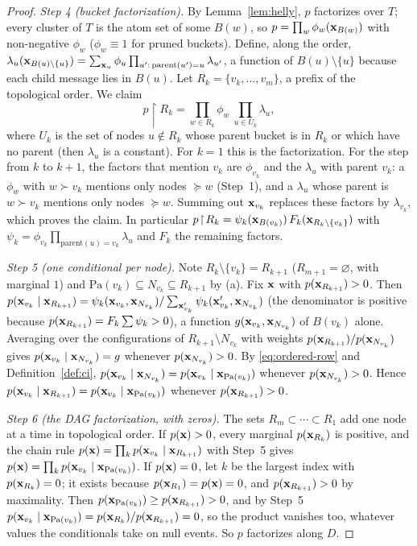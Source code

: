 \documentclass{article} %
\newcommand{\restr}{\!\restriction\!}
\providecommand{\Pa}{\mathrm{Pa}}
\begin{document}
\begin{proof}
\emph{Step 4 (bucket factorization).} By Lemma~\ref{lem:helly}, $p$ factorizes
over $T$; every cluster of $T$ is the atom set of some $B(w)$, so
$p=\prod_{w}\phi_w(\mathbf{x}_{B(w)})$ with non-negative $\phi_w$ ($\phi_w\equiv1$ for pruned
buckets). Define, along the order,
$\lambda_u(\mathbf{x}_{B(u)\setminus\{u\}})=\sum_{\mathbf{x}_u}\phi_u\prod_{u':\,\mathrm{parent}(u')=u}\lambda_{u'}$,
a function of $B(u)\setminus\{u\}$ because each child message lies in $B(u)$.
Let $R_k=\{v_k,\dots,v_m\}$, a prefix of the topological order. We claim
\[
  p\restr R_k=\prod_{w\in R_k}\phi_w\ \prod_{u\in U_k}\lambda_u ,
\]
where $U_k$ is the set of nodes $u\notin R_k$ whose parent bucket is in $R_k$ or
which have no parent (then $\lambda_u$ is a constant). For $k=1$ this is the
factorization. For the step from $k$ to $k+1$, the factors that mention $v_k$
are $\phi_{v_k}$ and the $\lambda_u$ with parent $v_k$: a $\phi_w$ with
$w\succ v_k$ mentions only nodes $\succeq w$ (Step~1), and a $\lambda_u$ whose
parent is $w\succ v_k$ mentions only nodes $\succeq w$. Summing out $\mathbf{x}_{v_k}$
replaces these factors by $\lambda_{v_k}$, which proves the claim.
In particular $p\restr R_k=\psi_k(\bx_{B(v_k)})\,F_k(\bx_{R_k\setminus\{v_k\}})$ with
$\psi_k=\phi_{v_k}\prod_{\mathrm{parent}(u)=v_k}\lambda_u$ and $F_k$ the remaining
factors.

\emph{Step 5 (one conditional per node).} Note $R_k\setminus\{v_k\}=R_{k+1}$
($R_{m+1}=\varnothing$, with marginal $1$) and $\Pa(v_k)\subseteq N_{v_k}\subseteq
R_{k+1}$ by (a). Fix $\mathbf{x}$ with $p(\mathbf{x}_{R_{k+1}})>0$. Then
$p(\mathbf{x}_{v_k}\mid\mathbf{x}_{R_{k+1}})=\psi_k(\mathbf{x}_{v_k},\mathbf{x}_{N_{v_k}})/\sum_{\mathbf{x}'_{v_k}}\psi_k(\mathbf{x}'_{v_k},\mathbf{x}_{N_{v_k}})$
(the denominator is positive because $p(\mathbf{x}_{R_{k+1}})=F_k\sum\psi_k>0$),
a function $g(\mathbf{x}_{v_k},\mathbf{x}_{N_{v_k}})$ of $B(v_k)$ alone. Averaging over the
configurations of $R_{k+1}\setminus N_{v_k}$ with weights
$p(\mathbf{x}_{R_{k+1}})/p(\mathbf{x}_{N_{v_k}})$ gives
$p(\mathbf{x}_{v_k}\mid\mathbf{x}_{N_{v_k}})=g$ whenever $p(\mathbf{x}_{N_{v_k}})>0$. By
\eqref{eq:ordered-row} and Definition~\ref{def:ci},
$p(\bx_{v_k}\mid\bx_{N_{v_k}})=p(\bx_{v_k}\mid\bx_{\Pa(v_k)})$ whenever
$p(\mathbf{x}_{N_{v_k}})>0$. Hence
$p(\bx_{v_k}\mid\bx_{R_{k+1}})=p(\bx_{v_k}\mid\bx_{\Pa(v_k)})$ whenever
$p(\mathbf{x}_{R_{k+1}})>0$.

\emph{Step 6 (the DAG factorization, with zeros).} The sets
$R_m\subset\cdots\subset R_1$ add one node at a time in topological order. If
$p(\mathbf{x})>0$, every marginal $p(\mathbf{x}_{R_k})$ is positive, and the chain rule
$p(\mathbf{x})=\prod_k p(\mathbf{x}_{v_k}\mid\mathbf{x}_{R_{k+1}})$ with Step~5 gives
$p(\bx)=\prod_k p(\bx_{v_k}\mid\bx_{\Pa(v_k)})$. If $p(\mathbf{x})=0$, let $k$ be the
largest index with $p(\mathbf{x}_{R_k})=0$; it exists because $p(\mathbf{x}_{R_1})=p(\mathbf{x})=0$, and
$p(\mathbf{x}_{R_{k+1}})>0$ by maximality. Then $p(\bx_{\Pa(v_k)})\ge p(\bx_{R_{k+1}})>0$,
and by Step~5 $p(\bx_{v_k}\mid\bx_{\Pa(v_k)})=p(\bx_{R_k})/p(\bx_{R_{k+1}})=0$, so the
product vanishes too, whatever values the conditionals take on null events. So
$p$ factorizes along $D$.


\end{proof}
\end{document}
